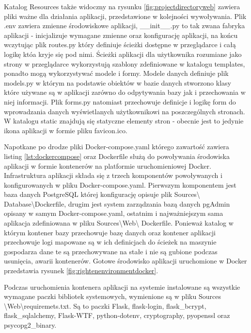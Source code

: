 \documentclass[a4paper,10pt, twoside]{report}
\begin{document}
\begin{large}
{Katalog Resources także widoczny na rysunku \ref*{fig:projectdirectoryweb} 
zawiera pliki ważne dla działania aplikacji, przedstawione w kolejności 
wywoływania. Plik .env zawiera zmienne środowiskowe aplikacji, \_\_init\_\_.py 
to tak zwana fabryka aplikacji - inicjalizuje wymagane zmienne oraz konfigurację
 aplikacji, na końcu wczytując plik routes.py który definiuje ścieżki dostępne 
w przeglądarce i całą logikę któa kryje się pod nimi. Ścieżki aplikacji dla 
użytkownika rozumiane jako strony w przeglądarce wykorzystują szablony 
zdefiniowane w katalogu templates, ponadto mogą wykorzystywać modele i formy. 
Modele danych definiuje plik models.py w którym na podstawie obiektów w bazie 
danych stworzono klasy które używane są w aplikacji zarówno do odpytywania bazy 
jak i przechowania w niej informacji. Plik forms.py natomiast przechowuje 
definicje i logikę form do wprowadzania danych wyświetlanych użytkownikowi na 
poszczególnych stronach. W katalogu static znajdują się statyczne elementy stron
 - obecnie jest to jedynie ikona aplikacji w formie pliku favicon.ico.}

\medskip
{Napotkane po drodze pliki Docker-compose.yaml którego zawartość zawiera listing
 \ref*{lst:dockercompose} oraz Dockerfile służą do powoływania środowiska 
aplikacji w formie kontenerów na platformie uruchomieniowej Docker. 
Infrastruktura aplikacji składa się z trzech komponentów powoływanych i 
konfigurowanych w pliku Docker-compose.yaml. Pierwszym komponentem jest baza 
danych PostgreSQL której konfigurację opisuje plik Sources\textbackslash
Database\textbackslash Dockerfile, drugim jest system zarządzania bazą danych 
pgAdmin opisany w samym Docker-compose.yaml, ostatnim i najważniejszym sama 
aplikacja zdefiniowana w pliku Sources\textbackslash Web\textbackslash
Dockerfile. Ponieważ katalog w którym kontener bazy przechowuje bazę danych oraz
 kontener aplikacji przechowuje logi mapowane są w ich definicjach do ścieżek na
 maszynie gospodarza dane te są przechowywane na stałe i nie są gubione podczas 
usunięcia, awarii kontenerów. Gotowe środowisko aplikacji uruchomione w Docker 
przedstawia rysunek \ref*{fig:rightenenvironmentdocker}.}

{Podczas uruchomienia kontenera aplikacji na systemie instalowane są wszystkie 
wymagane paczki bibliotek systemowych, wymienione są w pliku Sources
\textbackslash Web\textbackslash requiremets.txt. Są to paczki Flask, 
flask-login, flask\_bcrypt, flask\_sqlalchemy, Flask-WTF, python-dotenv, 
cryptography, pyopenssl oraz psycopg2\_binary.}


\end{large}
\end{document}
